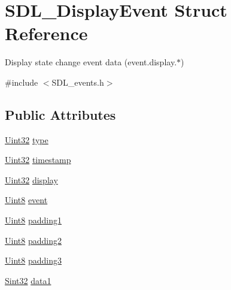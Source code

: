\hypertarget{struct_s_d_l___display_event}{}\section{S\+D\+L\+\_\+\+Display\+Event Struct Reference}
\label{struct_s_d_l___display_event}


Display state change event data (event.\+display.$\ast$)  




{\ttfamily \#include $<$S\+D\+L\+\_\+events.\+h$>$}

\subsection*{Public Attributes}
\begin{DoxyCompactItemize}
\item 
\mbox{\hyperlink{_s_d_l__stdinc_8h_add440eff171ea5f55cb00c4a9ab8672d}{Uint32}} \mbox{\hyperlink{struct_s_d_l___display_event_a5f4993ce9c5289a2ac046ae7a6dff544}{type}}
\item 
\mbox{\hyperlink{_s_d_l__stdinc_8h_add440eff171ea5f55cb00c4a9ab8672d}{Uint32}} \mbox{\hyperlink{struct_s_d_l___display_event_a6c4cd9f63a2ff62032602193c9bf605d}{timestamp}}
\item 
\mbox{\hyperlink{_s_d_l__stdinc_8h_add440eff171ea5f55cb00c4a9ab8672d}{Uint32}} \mbox{\hyperlink{struct_s_d_l___display_event_af7159e813fb168a2fdfe5070e6026a39}{display}}
\item 
\mbox{\hyperlink{_s_d_l__stdinc_8h_a2944638813a090aa23e62f4da842c3e2}{Uint8}} \mbox{\hyperlink{struct_s_d_l___display_event_a4850a90c06e18146d6a2ac235cdd7336}{event}}
\item 
\mbox{\hyperlink{_s_d_l__stdinc_8h_a2944638813a090aa23e62f4da842c3e2}{Uint8}} \mbox{\hyperlink{struct_s_d_l___display_event_a8a6937d7483828f3b9ac68fb79963e33}{padding1}}
\item 
\mbox{\hyperlink{_s_d_l__stdinc_8h_a2944638813a090aa23e62f4da842c3e2}{Uint8}} \mbox{\hyperlink{struct_s_d_l___display_event_afe4ffe1364f1a29457636c8b74c7a3ce}{padding2}}
\item 
\mbox{\hyperlink{_s_d_l__stdinc_8h_a2944638813a090aa23e62f4da842c3e2}{Uint8}} \mbox{\hyperlink{struct_s_d_l___display_event_aa4de9fba8f58fedb949894741ab0552b}{padding3}}
\item 
\mbox{\hyperlink{_s_d_l__stdinc_8h_a7a90b941db9d4582e9ad7abb9940ff7e}{Sint32}} \mbox{\hyperlink{struct_s_d_l___display_event_a4feb7329af16a060cc16d539e5cb13b5}{data1}}
\end{DoxyCompactItemize}


